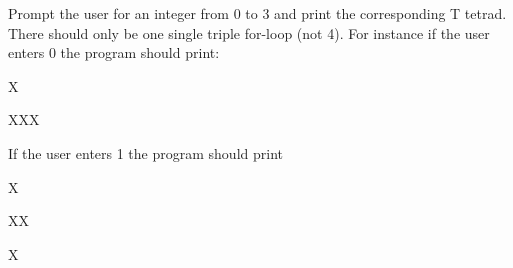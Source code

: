 \begin{ex}
Prompt the user for an integer from 0 to 3 and print the corresponding T tetrad. There should only be one single triple for-loop (not 4). For instance if the user enters 0 the program should print:

\begin{consolethree}
X

XXX 
\end{consolethree}

If the user enters 1 the program should print

\begin{consolethree}
X

XX

X \\
\end{consolethree}
\end{ex}
